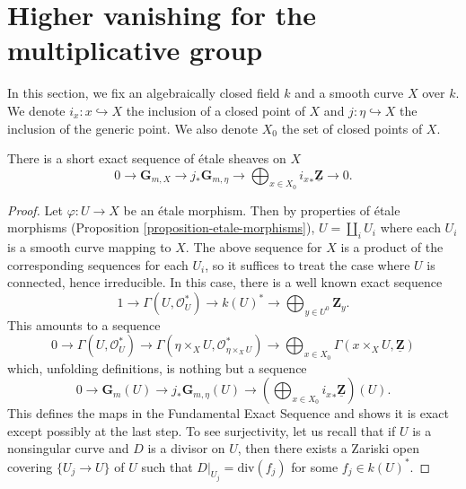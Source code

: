 \section{Higher vanishing for the multiplicative group}
\label{section-higher-Gm}

\noindent
In this section, we fix an algebraically closed field $k$ and a smooth curve
$X$ over $k$. We denote $i_x : x \hookrightarrow X$ the inclusion of a closed
point of $X$ and $j : \eta \hookrightarrow X$ the inclusion of the generic
point. We also denote $X_0$ the set of closed points of $X$.

\begin{theorem}
\label{theorem-fundamental-exact-sequence}
There is a short exact sequence of \'etale sheaves on $X$
$$
0 \longrightarrow
\mathbf{G}_{m, X} \longrightarrow
j_* \mathbf{G}_{m, \eta} \longrightarrow
\bigoplus\nolimits_{x \in X_0} {i_x}_* \underline{\mathbf{Z}}
\longrightarrow 0.
$$
\end{theorem}

\begin{proof}
Let $\varphi : U \to X$ be an \'etale morphism. Then by properties of
\'etale morphisms (Proposition \ref{proposition-etale-morphisms}),
$U = \coprod_i U_i$ where each $U_i$ is a smooth curve mapping to $X$.
The above sequence for $X$ is a product of the corresponding sequences
for each $U_i$, so it suffices to treat the case where $U$ is connected,
hence irreducible. In this case, there is a well known exact sequence
$$
1 \longrightarrow
\Gamma(U, \mathcal{O}_U^*) \longrightarrow
k(U)^* \longrightarrow \bigoplus\nolimits_{y \in U^0} \mathbf{Z}_y.
$$
This amounts to a sequence
$$
0 \longrightarrow \Gamma(U, \mathcal{O}_U^*) \longrightarrow
\Gamma(\eta \times_X U, \mathcal{O}_{\eta \times_X U}^*) \longrightarrow
\bigoplus\nolimits_{x \in X_0}
\Gamma(x \times_X U, \underline{\mathbf{Z}})
$$
which, unfolding definitions, is nothing but a sequence
$$
0 \longrightarrow \mathbf{G}_m(U) \longrightarrow
j_* \mathbf{G}_{m, \eta}(U) \longrightarrow
\left(\bigoplus\nolimits_{x \in X_0} {i_x}_* \underline{\mathbf{Z}}\right)(U).
$$
This defines the maps in the Fundamental Exact Sequence and shows it is exact
except possibly at the last step. To see surjectivity, let us recall that if
$U$ is a nonsingular curve and $D$ is a divisor on $U$,
then there exists a Zariski open covering $\{U_j \to U\}$ of $U$
such that $D|_{U_j} = \text{div}(f_j)$ for some $f_j \in k(U)^*$.
\end{proof}

